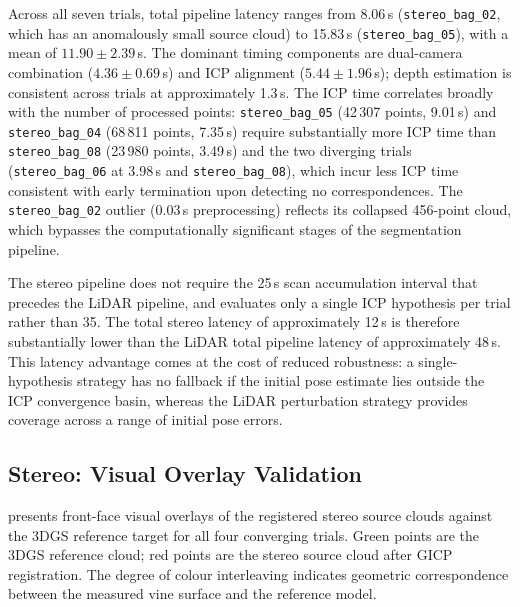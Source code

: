 Across all seven trials, total pipeline latency ranges from 8.06\,s (\texttt{stereo\_bag\_02}, which has an anomalously small source cloud) to 15.83\,s (\texttt{stereo\_bag\_05}), with a mean of $11.90 \pm 2.39$\,s. The dominant timing components are dual-camera combination ($4.36 \pm 0.69$\,s) and ICP alignment ($5.44 \pm 1.96$\,s); depth estimation is consistent across trials at approximately 1.3\,s. The ICP time correlates broadly with the number of processed points: \texttt{stereo\_bag\_05} (42\,307 points, 9.01\,s) and \texttt{stereo\_bag\_04} (68\,811 points, 7.35\,s) require substantially more ICP time than \texttt{stereo\_bag\_08} (23\,980 points, 3.49\,s) and the two diverging trials (\texttt{stereo\_bag\_06} at 3.98\,s and \texttt{stereo\_bag\_08}), which incur less ICP time consistent with early termination upon detecting no correspondences. The \texttt{stereo\_bag\_02} outlier (0.03\,s preprocessing) reflects its collapsed 456-point cloud, which bypasses the computationally significant stages of the segmentation pipeline.

The stereo pipeline does not require the 25\,s scan accumulation interval that precedes the LiDAR pipeline, and evaluates only a single ICP hypothesis per trial rather than 35. The total stereo latency of approximately 12\,s is therefore substantially lower than the LiDAR total pipeline latency of approximately 48\,s. This latency advantage comes at the cost of reduced robustness: a single-hypothesis strategy has no fallback if the initial pose estimate lies outside the ICP convergence basin, whereas the LiDAR perturbation strategy provides coverage across a range of initial pose errors.

\subsection{Stereo: Visual Overlay Validation}
\label{subsec:pa-results-stereo-overlay}

 presents front-face visual overlays of the registered stereo source clouds against the 3DGS reference target for all four converging trials. Green points are the 3DGS reference cloud; red points are the stereo source cloud after GICP registration. The degree of colour interleaving indicates geometric correspondence between the measured vine surface and the reference model.

